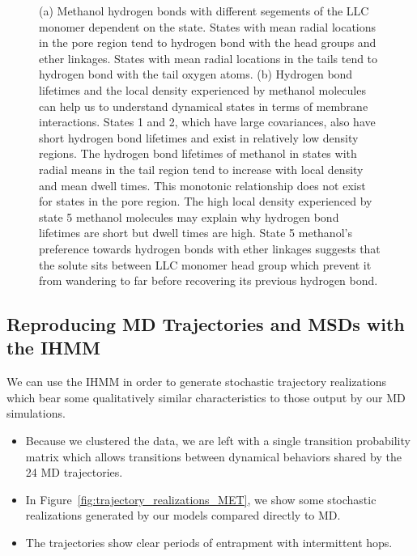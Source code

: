 \documentclass{article}
\begin{document}
\begin{figure}
  \caption{(a) Methanol hydrogen bonds with different segements of the LLC monomer
  dependent on the state. States with mean radial locations in the pore region tend to
  hydrogen bond with the head groups and ether linkages. States with mean radial
  locations in the tails tend to hydrogen bond with the tail oxygen atoms.
  (b) Hydrogen bond lifetimes and the local density experienced by methanol
  molecules can help us to understand dynamical states in terms of membrane 
  interactions. States 1 and 2, which have large covariances, also have short
  hydrogen bond lifetimes and exist in relatively low density regions. The
  hydrogen bond lifetimes of methanol in states with radial means in the tail
  region tend to increase with local density and mean dwell times. This monotonic
  relationship does not exist for states in the pore region. The high 
  local density experienced by state 5 methanol molecules may explain why 
  hydrogen bond lifetimes are short but dwell times are high. State 5 methanol's
  preference towards hydrogen bonds with ether linkages suggests that the solute
  sits between LLC monomer head group which prevent it from wandering to far
  before recovering its previous hydrogen bond.
  }\label{fig:hbond_pichart}
  \end{figure}
  
    
  \subsection{Reproducing MD Trajectories and MSDs with the IHMM}
  
  
  We can use the IHMM in order to generate stochastic trajectory realizations
  which bear some qualitatively similar characteristics to those output
  by our MD simulations.
  \begin{itemize}
    \item Because we clustered the data, we are left with a single transition
    probability matrix which allows transitions between dynamical behaviors
    shared by the 24 MD trajectories.
    \item In Figure~\ref{fig:trajectory_realizations_MET}, we show some stochastic
    realizations generated by our models compared directly to MD.
    \item The trajectories show clear periods of entrapment with intermittent hops.
  \end{itemize}
  
\end{document}
